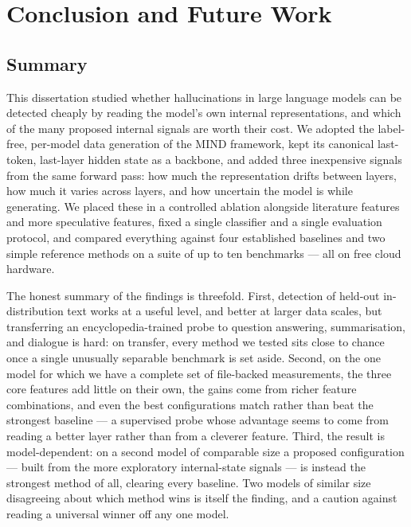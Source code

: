 \chapter{Conclusion and Future Work}
\label{ch:conclusion}

\section{Summary}

This dissertation studied whether hallucinations in large language models can be detected
cheaply by reading the model's own internal representations, and which of the many proposed
internal signals are worth their cost. We adopted the label-free, per-model data generation
of the MIND framework, kept its canonical last-token, last-layer hidden state as a backbone,
and added three inexpensive signals from the same forward pass: how much the representation
drifts between layers, how much it varies across layers, and how uncertain the model is while
generating. We placed these in a controlled ablation alongside literature features and more
speculative features, fixed a single classifier and a single evaluation protocol, and
compared everything against four established baselines and two simple reference methods on a
suite of up to ten benchmarks --- all on free cloud hardware.

The honest summary of the findings is threefold. First, detection of held-out
in-distribution text works at a useful level, and better at larger data scales, but
transferring an encyclopedia-trained probe to question answering, summarisation, and dialogue
is hard: on transfer, every method we tested sits close to chance once a single unusually
separable benchmark is set aside. Second, on the one model for which we have a complete set
of file-backed measurements, the three core features add little on their own, the gains come
from richer feature combinations, and even the best configurations match rather than beat the
strongest baseline --- a supervised probe whose advantage seems to come from reading a better
layer rather than from a cleverer feature. Third, the result is model-dependent: on a second
model of comparable size a proposed configuration --- built from the more exploratory
internal-state signals --- is instead the strongest method of all, clearing every baseline.
Two models of similar size disagreeing about which method wins is itself the finding, and a
caution against reading a universal winner off any one model.

